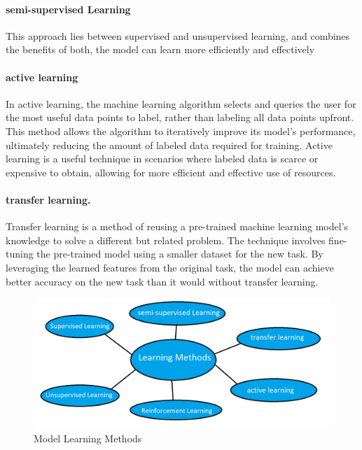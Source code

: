 			\paragraph{semi-supervised Learning}
			This approach lies between supervised and unsupervised learning, and combines the benefits of both, the model can learn more efficiently and effectively 
			\paragraph{active learning}
			In active learning, the machine learning algorithm selects and queries the user for the most useful data points to label, rather than labeling all data points upfront. This method allows the algorithm to iteratively improve its model's performance, ultimately reducing the amount of labeled data required for training. Active learning is a useful technique in scenarios where labeled data is scarce or expensive to obtain, allowing for more efficient and effective use of resources. \cite{settles2009active}
			\paragraph{transfer learning.}
			Transfer learning is a method of reusing a pre-trained machine learning model's knowledge to solve a different but related problem. The technique involves fine-tuning the pre-trained model using a smaller dataset for the new task. By leveraging the learned features from the original task, the model can achieve better accuracy on the new task than it would without transfer learning.
			\cite{pan2010survey}
			\begin{figure}[h]
				\centering
				\includegraphics[width=0.8\linewidth]{images chap1/methods.png}
				\caption{Model Learning Methods}
				\label{methods}
			\end{figure}
			
